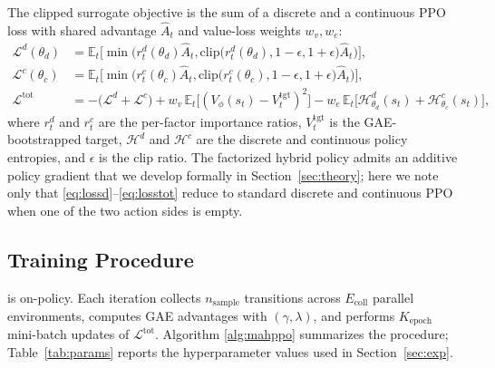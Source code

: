 The clipped surrogate objective is the sum of a discrete and a
continuous PPO loss with shared advantage $\hat{A}_{t}$ and value-loss
weights $w_{v}, w_{e}$:
\begin{align}
\mathcal{L}^{d}(\theta_{d})
  &= \mathbb{E}_{t}\!\Big[\min\!\big(r^{d}_{t}(\theta_{d})\hat{A}_{t},
        \mathrm{clip}\big(r^{d}_{t}(\theta_{d}),1-\epsilon,1+\epsilon\big)\hat{A}_{t}\big)\Big],
        \label{eq:lossd}\\
\mathcal{L}^{c}(\theta_{c})
  &= \mathbb{E}_{t}\!\Big[\min\!\big(r^{c}_{t}(\theta_{c})\hat{A}_{t},
        \mathrm{clip}\big(r^{c}_{t}(\theta_{c}),1-\epsilon,1+\epsilon\big)\hat{A}_{t}\big)\Big],
        \label{eq:lossc}\\
\mathcal{L}^{\mathrm{tot}}
  &= -\big(\mathcal{L}^{d}+\mathcal{L}^{c}\big)
     + w_{v}\,\mathbb{E}_{t}\!\big[(V_{\phi}(s_{t})-V^{\mathrm{tgt}}_{t})^{2}\big]
     - w_{e}\,\mathbb{E}_{t}\!\big[\mathcal{H}^{d}_{\theta_{d}}(s_{t})
       +\mathcal{H}^{c}_{\theta_{c}}(s_{t})\big],\label{eq:losstot}
\end{align}
where $r^{d}_{t}$ and $r^{c}_{t}$ are the per-factor importance ratios,
$V^{\mathrm{tgt}}_{t}$ is the GAE-bootstrapped target,
$\mathcal{H}^{d}$ and $\mathcal{H}^{c}$ are the discrete and continuous
policy entropies, and $\epsilon$ is the clip ratio. The factorized
hybrid policy admits an additive policy gradient that we develop
formally in Section~\ref{sec:theory}; here we note only that
\eqref{eq:lossd}--\eqref{eq:losstot} reduce to standard discrete and
continuous PPO when one of the two action sides is empty.

\subsection{Training Procedure}\label{subsec:train}
\method is on-policy. Each iteration collects $n_{\mathrm{sample}}$
transitions across $E_{\mathrm{coll}}$ parallel environments, computes
GAE advantages with $(\gamma,\lambda)$, and performs $K_{\mathrm{epoch}}$
mini-batch updates of $\mathcal{L}^{\mathrm{tot}}$. Algorithm
\ref{alg:mahppo} summarizes the procedure; Table~\ref{tab:params}
reports the hyperparameter values used in
Section~\ref{sec:exp}.

